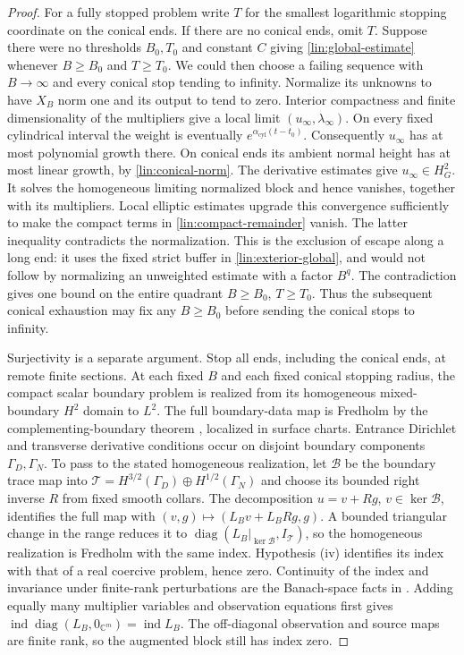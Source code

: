 \begin{proof}
For a fully stopped problem write $T$ for the smallest logarithmic
stopping coordinate on the conical ends.  If there are no conical
ends, omit $T$.  Suppose there were no thresholds $B_0,T_0$ and
constant $C$ giving \eqref{lin:global-estimate} whenever
$B\ge B_0$ and $T\ge T_0$.  We could then choose a failing sequence
with $B\to\infty$ and every conical stop tending to infinity.
Normalize its unknowns to have $X_B$ norm one
and its output to tend to zero.  Interior compactness and finite
dimensionality of the multipliers give a local limit $(u_\infty,
\lambda_\infty)$.  On every fixed cylindrical interval the weight is
eventually $e^{\alpha_{\mathrm{cyl}}(t-t_0)}$.  Consequently $u_\infty$ has at most
polynomial growth there.  On conical ends its ambient normal height
has at most linear growth, by \eqref{lin:conical-norm}.  The derivative
estimates give $u_\infty\in H^2_G$.  It solves the homogeneous limiting
normalized block and hence vanishes, together with its multipliers.
Local elliptic estimates upgrade this convergence sufficiently to
make the compact terms in \eqref{lin:compact-remainder} vanish.  The
latter inequality contradicts the normalization.  This is the
exclusion of escape along a long end: it uses the fixed strict buffer
in \eqref{lin:exterior-global}, and would not follow by normalizing an
unweighted estimate with a factor $B^q$.
The contradiction gives one bound on the entire quadrant
$B\ge B_0$, $T\ge T_0$.  Thus the subsequent conical exhaustion
may fix any $B\ge B_0$ before sending the conical stops to infinity.

Surjectivity is a separate argument. Stop all ends, including the
conical ends, at remote finite sections. At each fixed $B$ and each
fixed conical stopping radius, the compact scalar boundary problem is
realized from its homogeneous mixed-boundary $H^2$ domain to $L^2$.
The full boundary-data map is Fredholm by the complementing-boundary theorem
\cite[Chapter~1, Section~1, subsection~3, Theorem~1.1]{NP1994}, localized in
surface charts. Entrance Dirichlet and transverse derivative
conditions occur on disjoint boundary components $\Gamma_D,\Gamma_N$.
To pass to the stated
homogeneous realization, let $\mathcal B$ be the boundary trace map into
$\mathcal T=H^{3/2}(\Gamma_D)\oplus H^{1/2}(\Gamma_N)$ and choose its
bounded right inverse $R$ from fixed smooth collars.  The decomposition
$u=v+Rg$, $v\in\ker\mathcal B$, identifies the full map with
$(v,g)\mapsto(L_Bv+L_BRg,g)$.  A bounded triangular change in the range
reduces it to $\operatorname{diag}(L_B|_{\ker\mathcal B},I_{\mathcal T})$,
so the homogeneous realization is Fredholm with the same index.
Hypothesis (iv)
identifies its index with that of a real coercive problem, hence zero.
Continuity of the index and invariance under finite-rank perturbations
are the Banach-space facts in
\cite[Chapter~IV, Sections~5.2--5.3, Theorems~5.17 and~5.26]{Kato1995}.
Adding equally many multiplier variables and observation equations first
gives $\operatorname{ind}\operatorname{diag}(L_B,0_{\mathbb C^m})
=\operatorname{ind}L_B$.  The off-diagonal observation and source maps
are finite rank, so the augmented block still has index zero.


\end{proof}

